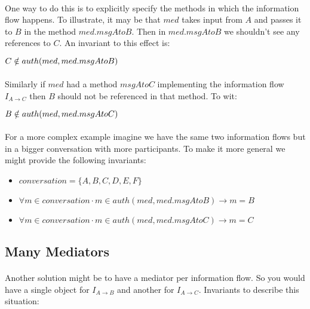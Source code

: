 \documentclass{article}
\begin{document}
\paragraph{}
One way to do this is to explicitly specify the methods in which the information flow happens. To illustrate, it may be that $med$ takes input from $A$ and passes it to $B$ in the method $med.msgAtoB$. Then in $med.msgAtoB$ we shouldn't see any references to $C$. An invariant to this effect is:

$\\C \notin auth(med, med.msgAtoB)$

\paragraph{}
Similarly if $med$ had a method $msgAtoC$ implementing the information flow $I_{A \rightarrow C}$ then $B$ should not be referenced in that method. To wit:

$\\B \notin auth(med, med.msgAtoC)$

\paragraph{}
For a more complex example imagine we have the same two information flows but in a bigger conversation with more participants. To make it more general we might provide the following invariants:

\begin{itemize}
	\item $conversation = \{A, B, C, D, E, F\}$
	\item $\forall m \in conversation \cdot m \in auth(med, med.msgAtoB) \rightarrow m = B$
	\item $\forall m \in conversation \cdot m \in auth(med, med.msgAtoC) \rightarrow m = C$
\end{itemize}

\subsection*{Many Mediators}

\paragraph{}
Another solution might be to have a mediator per information flow. So you would have a single object for $I_{A \rightarrow B}$ and another for $I_{A \rightarrow C}$. Invariants to describe this situation:
\end{document}
